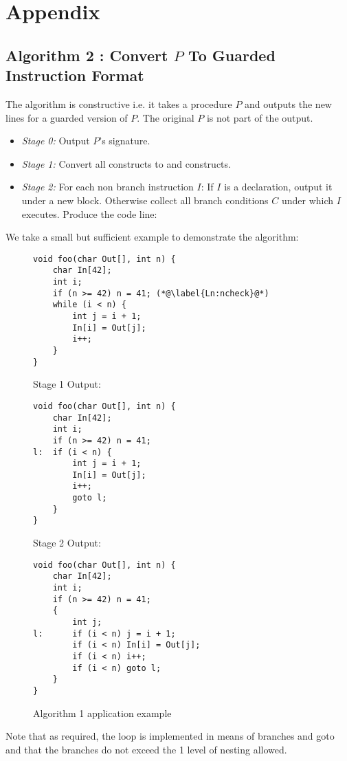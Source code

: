 \section{Appendix}\label{Se:Appendix}


\subsection{Algorithm 2 : Convert $P$ To Guarded Instruction Format} \label{Se:GuardedAlg}
The algorithm is constructive i.e. it takes a procedure $P$ and outputs the new lines for a guarded version of $P$. The original $P$ is not part of the output.
\begin{itemize}
\item \emph{Stage 0:} Output $P$'s signature.
\item \emph{Stage 1:} Convert all  constructs to  and  constructs.
\item \emph{Stage 2:} For each non branch instruction $I$:
\subitem If $I$ is a declaration, output it under a new block.
\subitem Otherwise collect all branch conditions $C$ under which $I$ executes. Produce the code line: 
\end{itemize}

We take a small but sufficient example to demonstrate the algorithm:
\begin{figure}[H]
\begin{lstlisting}
void foo(char Out[], int n) {
    char In[42];
    int i;
    if (n >= 42) n = 41; (*@\label{Ln:ncheck}@*)
    while (i < n) {
        int j = i + 1;
        In[i] = Out[j];
        i++;
    }
}
\end{lstlisting}
Stage 1 Output:
\begin{lstlisting}
void foo(char Out[], int n) {
    char In[42];
    int i;
    if (n >= 42) n = 41;
l:  if (i < n) {
        int j = i + 1;
        In[i] = Out[j];
        i++;
        goto l;
    }
}
\end{lstlisting}
Stage 2 Output:
\begin{lstlisting}
void foo(char Out[], int n) {
    char In[42];
    int i;
    if (n >= 42) n = 41;
    {
        int j;
l:      if (i < n) j = i + 1;
        if (i < n) In[i] = Out[j];
        if (i < n) i++;
        if (i < n) goto l;
    }
}
\end{lstlisting} \caption{Algorithm 1 application example}
\end{figure}

Note that as required, the loop is implemented in means of branches and goto and that the branches do not exceed the 1 level of nesting allowed.

